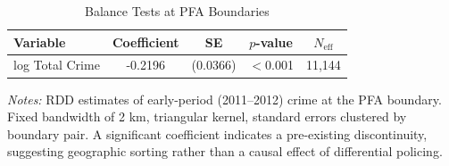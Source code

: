 \begin{table}[htbp]
\centering
\caption{Balance Tests at PFA Boundaries}
\label{tab:balance}
\begin{tabular}{lcccc}
\toprule
Variable & Coefficient & SE & $p$-value & $N_{\text{eff}}$ \\
\midrule
log Total Crime & -0.2196 & (0.0366) & $<$0.001 & 11,144 \\
\bottomrule
\end{tabular}
\parbox{\textwidth}{\footnotesize \textit{Notes:} RDD estimates of early-period (2011--2012) crime at the PFA boundary. Fixed bandwidth of 2 km, triangular kernel, standard errors clustered by boundary pair. A significant coefficient indicates a pre-existing discontinuity, suggesting geographic sorting rather than a causal effect of differential policing.}
\end{table}
